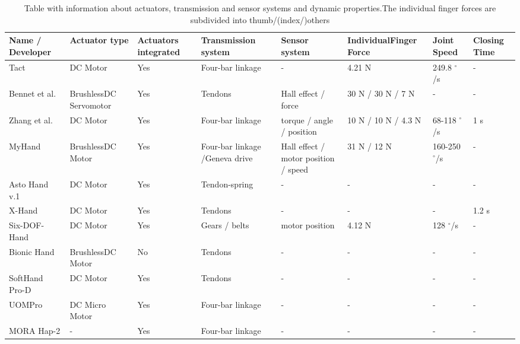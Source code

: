 \documentclass[a4paper, 10pt, conference]{ieeeconf}      %
\begin{document}
\vspace{10cm}

\begin{table}[h]

\begin{tabular}{p{2.4cm}|p{2cm}|p{1.2cm}|p{2.1cm}|p{2cm}|p{1.5cm}|p{1.5cm}|p{1.2cm}}

Name / \newline Developer & Actuator type & Actuators integrated & Transmission system & Sensor system & Individual\newline Finger Force & Joint Speed & Closing Time\\
\hline
Tact & DC Motor & Yes & Four-bar linkage & - & 4.21 N & 249.8 $^\circ$/s & -\\
\hline
Bennet et al. & Brushless\newline DC Servomotor & Yes & Tendons & Hall effect / force & 30 N / 30 N / 7 N & - & -\\
\hline
Zhang et al. & DC Motor & Yes & Four-bar linkage & torque / angle / position & 10 N / 10 N / 4.3 N & 68-118 $^\circ$/s & 1 s\\
\hline
MyHand & Brushless\newline DC Motor & Yes & Four-bar linkage /\newline Geneva drive & Hall effect / motor position / speed & 31 N / 12 N & 160-250 $^\circ$/s & -\\
\hline
Asto Hand v.1 & DC Motor & Yes & Tendon-spring & - & - & - & -\\
\hline
X-Hand & DC Motor & Yes & Tendons & - & - & - & 1.2 s\\
\hline
Six-DOF-Hand & DC Motor & Yes & Gears / belts & motor position & 4.12 N & 128 $^\circ$/s & -\\
\hline
Bionic Hand & Brushless\newline DC Motor & No & Tendons & - & - & - & -\\
\hline
SoftHand Pro-D & DC Motor & Yes & Tendons & - & - & - & -\\
\hline
UOMPro & DC Micro Motor & Yes & Four-bar linkage & - & - & - & -\\
\hline
MORA Hap-2 & - & Yes & Four-bar linkage & - & - & - & -\\
 

\end{tabular}

\caption{Table with information about actuators, transmission and sensor systems and dynamic properties.\newline The individual finger forces are subdivided into thumb/(index/)others}

\end{table}
\end{document}
